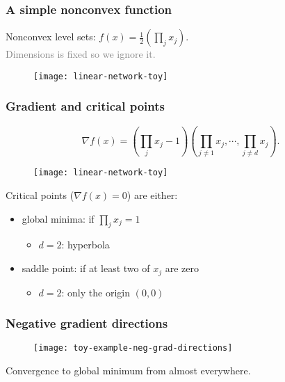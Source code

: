 \documentclass[aspectratio=149]{beamer}
\begin{document}
\begin{frame}
  \frametitle{A simple nonconvex function}
  Nonconvex level sets: $f(x)= \frac12 {\left( \prod_j x_j \right)}$. \\
  \textcolor{gray}{Dimensions is fixed so we ignore it.}

  \begin{figure}[ht]
    \centering
    \texttt{[image: linear-network-toy]}
  \end{figure}
\end{frame}


\begin{frame}
  \frametitle{Gradient and critical points}

  \begin{equation}
    \nabla f(x) = \left( \prod_j x_j - 1\right) \left( \prod_{j\neq1} x_j, \cdots, \prod_{j\neq d}x_j \right).
  \end{equation}
  \begin{minipage}{0.5\textwidth}
    \begin{figure}[ht]
      \centering
      \texttt{[image: linear-network-toy]}
    \end{figure}
  \end{minipage}
  \begin{minipage}{0.45\textwidth}
    Critical points ($\nabla f(x) = 0$) are either:
    \begin{itemize}
      \item global minima: if $\prod_j x_j = 1$
            \begin{itemize}
              \item $d=2$: hyperbola
            \end{itemize}
      \item saddle point: if at least two of $x_j$ are zero
            \begin{itemize}
              \item $d=2$: only the origin $(0,0)$
            \end{itemize}
    \end{itemize}
  \end{minipage}
\end{frame}


\begin{frame}
  \frametitle{Negative gradient directions}
  \begin{figure}[ht]
    \centering
    \texttt{[image: toy-example-neg-grad-directions]}
  \end{figure}
  Convergence to global minimum from almost everywhere.
\end{frame}
\end{document}
